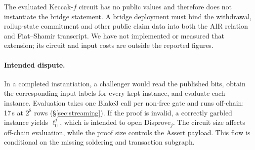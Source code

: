 \documentclass[11pt]{article}
\begin{document}
The evaluated Keccak-$f$ circuit has no public values and therefore does not
instantiate the bridge statement. A bridge deployment must bind the withdrawal,
rollup-state commitment and other public claim data into both the AIR relation
and Fiat--Shamir transcript. We have not implemented or measured that
extension; its circuit and input costs are outside the reported figures.

\paragraph{Intended dispute.} In a completed instantiation, a challenger would
read the published bits, obtain the corresponding input labels for every kept
instance, and evaluate each instance. Evaluation takes one Blake3 call per
non-free gate and runs off-chain: 17\,s at $2^8$ rows
(\S\ref{sec:streaming}). If the proof is invalid, a correctly garbled instance
yields $\ell^j_0$, which is intended to open Disprove$_j$. The circuit size
affects off-chain evaluation, while the proof size controls the Assert payload.
This flow is conditional on the missing soldering and transaction subgraph.
\end{document}
